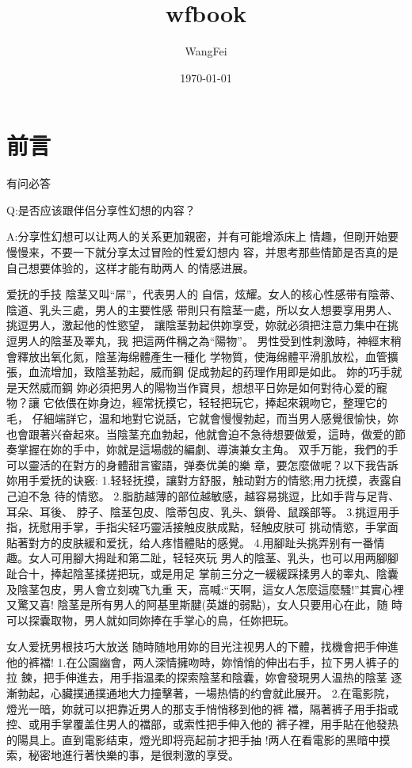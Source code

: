 \documentclass[12pt,UTF8]{ctexbook}
\title{\heiti\zihao{0} wfbook}
\author{WangFei}
\date{\today}
\begin{document}
\maketitle
\tableofcontents

\frontmatter

\chapter{前言}

有问必答

Q:是否应该跟伴侣分享性幻想的内容？

A:分享性幻想可以让两人的关系更加親密，并有可能增添床上
情趣，但剛开始要慢慢来，不要一下就分享太过冒险的性爱幻想内
容，并思考那些情節是否真的是自己想要体验的，这样才能有助两人
的情感进展。

爱抚的手技
陰茎又叫“屌”，代表男人的
自信，炫耀。女人的核心性感带有陰蒂、陰道、乳头三處，男人的主要性感
带則只有陰茎一處，所以女人想要享用男人、挑逗男人，激起他的性慾望，
讓陰茎勃起供妳享受，妳就必須把注意力集中在挑逗男人的陰茎及睪丸，我
把這两件稱之為“陽物”。
男性受到性刺激時，神經末稍會釋放出氧化氮，陰茎海绵體產生一種化
学物質，使海绵體平滑肌放松，血管擴張，血流增加，致陰茎勃起，威而鋼
促成勃起的药理作用即是如此。
妳的巧手就是天然威而鋼
妳必須把男人的陽物当作寶貝，想想平日妳是如何對待心爱的寵物？讓
它依偎在妳身边，經常抚摸它，轻轻把玩它，捧起來親吻它，整理它的毛，
仔細端詳它，温和地對它说話，它就會慢慢勃起，而当男人感覺很愉快，妳
也會跟著兴奋起來。当陰茎充血勃起，他就會迫不急待想要做爱，這時，做爱的節奏掌握在妳的手中，妳就是這場戲的編劇、導演兼女主角。
双手万能，我們的手可以靈活的在對方的身體甜言蜜語，弹奏优美的樂
章，要怎麼做呢？以下我告訴妳用手爱抚的诀竅:
1.轻轻抚摸，讓對方舒服，触动對方的情慾;用力抚摸，表露自己迫不急
待的情慾。
2.脂肪越薄的部位越敏感，越容易挑逗，比如手背与足背、耳朵、耳後、
脖子、陰茎包皮、陰蒂包皮、乳头、鎖骨、鼠蹊部等。
3.挑逗用手指，抚慰用手掌，手指尖轻巧靈活接触皮肤成點，轻触皮肤可
挑动情慾，手掌面貼著對方的皮肤緩和爱抚，给人疼惜體貼的感覺。
4.用腳趾头挑弄别有一番情趣。女人可用腳大拇趾和第二趾，轻轻夾玩
男人的陰茎、乳头，也可以用两腳腳趾合十，捧起陰茎揉搓把玩，或是用足
掌前三分之一緩緩踩揉男人的睾丸、陰囊及陰茎包皮，男人會立刻魂飞九重
天，高喊:“天啊，這女人怎麼這麼騷!”其實心裡又驚又喜!
陰茎是所有男人的阿基里斯腱(英雄的弱點)，女人只要用心在此，随
時可以探囊取物，男人就如同妳捧在手掌心的鳥，任妳把玩。

女人爱抚男根技巧大放送
随時随地用妳的目光注视男人的下體，找機會把手伸進他的裤襠!
1.在公園幽會，两人深情擁吻時，妳悄悄的伸出右手，拉下男人裤子的拉
鍊，把手伸進去，用手指温柔的探索陰茎和陰囊，妳會發現男人温热的陰茎
逐漸勃起，心臟撲通撲通地大力撞擊著，一場热情的约會就此展开。
2.在電影院，燈光一暗，妳就可以把靠近男人的那支手悄悄移到他的裤
襠，隔著裤子用手指或控、或用手掌覆盖住男人的襠部，或索性把手伸入他的
裤子裡，用手貼在他發热的陽具上。直到電影结束，燈光即将亮起前才把手抽
!两人在看電影的黑暗中摸索，秘密地進行著快樂的事，是很刺激的享受。
\end{document}
